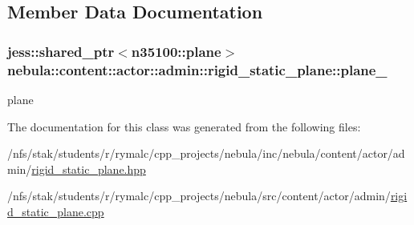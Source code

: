 \subsection{Member Data Documentation}
\hypertarget{classnebula_1_1content_1_1actor_1_1admin_1_1rigid__static__plane_a1768cc411027ded6e34fbddb97ee4e62}{
\subsubsection[{plane\_\-}]{\setlength{\rightskip}{0pt plus 5cm}jess::shared\_\-ptr$<${\bf n35100::plane}$>$ {\bf nebula::content::actor::admin::rigid\_\-static\_\-plane::plane\_\-}}}
\label{classnebula_1_1content_1_1actor_1_1admin_1_1rigid__static__plane_a1768cc411027ded6e34fbddb97ee4e62}


plane 

The documentation for this class was generated from the following files:\begin{DoxyCompactItemize}
\item 
/nfs/stak/students/r/rymalc/cpp\_\-projects/nebula/inc/nebula/content/actor/admin/\hyperlink{admin_2rigid__static__plane_8hpp}{rigid\_\-static\_\-plane.hpp}\item 
/nfs/stak/students/r/rymalc/cpp\_\-projects/nebula/src/content/actor/admin/\hyperlink{admin_2rigid__static__plane_8cpp}{rigid\_\-static\_\-plane.cpp}\end{DoxyCompactItemize}
